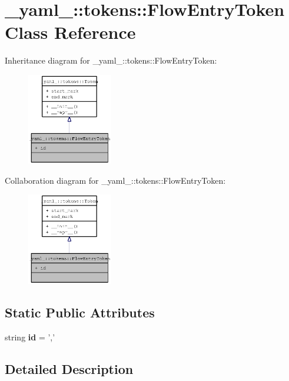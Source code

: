 \section{\_\-yaml\_\-::tokens::FlowEntryToken Class Reference}
\label{class__yaml___1_1tokens_1_1FlowEntryToken}
Inheritance diagram for \_\-yaml\_\-::tokens::FlowEntryToken:\nopagebreak
\begin{figure}[H]
\begin{center}
\leavevmode
\includegraphics[width=106pt]{class__yaml___1_1tokens_1_1FlowEntryToken__inherit__graph}
\end{center}
\end{figure}
Collaboration diagram for \_\-yaml\_\-::tokens::FlowEntryToken:\nopagebreak
\begin{figure}[H]
\begin{center}
\leavevmode
\includegraphics[width=106pt]{class__yaml___1_1tokens_1_1FlowEntryToken__coll__graph}
\end{center}
\end{figure}
\subsection*{Static Public Attributes}
\begin{CompactItemize}
\item 
string {\bf id} = ','
\end{CompactItemize}


\subsection{Detailed Description}



